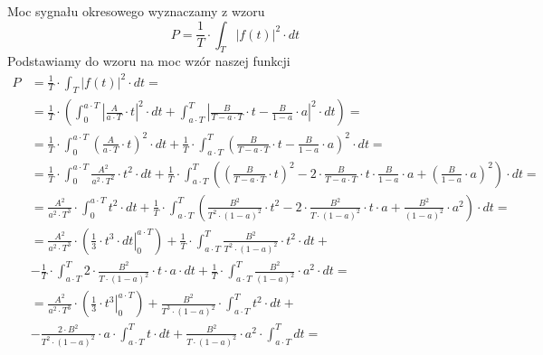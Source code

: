 \begin{task}
Moc sygnału okresowego wyznaczamy z wzoru
\begin{equation}
P=\frac{1}{T} \cdot \int_{T}^{}\left|f(t)\right|^2 \cdot dt
\end{equation}
Podstawiamy do wzoru na moc wzór naszej funkcji
\begin{align*}
P&=\frac{1}{T} \cdot \int_{T}^{}\left|f(t)\right|^2 \cdot dt=\\
 &=\frac{1}{T} \cdot \left( \int_{0}^{a \cdot T}\left|\frac{A}{a \cdot T}\cdot t \right|^2 \cdot dt
  +\int_{a \cdot T}^{T}\left|\frac{B}{T - a \cdot T}\cdot t - \frac{B}{1 - a} \cdot a\right|^2 \cdot dt \right)=\\ 
 &=\frac{1}{T} \cdot \int_{0}^{a \cdot T}\left(\frac{A}{a \cdot T}\cdot t \right)^2 \cdot dt
  +\frac{1}{T} \cdot \int_{a \cdot T}^{T}\left(\frac{B}{T - a \cdot T}\cdot t - \frac{B}{1 - a} \cdot a\right)^2 \cdot dt=\\ 
 &=\frac{1}{T} \cdot \int_{0}^{a \cdot T}\frac{A^2}{a^2 \cdot T^2}\cdot t^2 \cdot dt
 +\frac{1}{T} \cdot \int_{a \cdot T}^{T}\left(\left(\frac{B}{T - a \cdot T}\cdot t\right)^2 - 2\cdot \frac{B}{T - a \cdot T}\cdot t \cdot  \frac{B}{1 - a} \cdot a + \left( \frac{B}{1 - a} \cdot a\right)^2 \right) \cdot dt=\\
 &=\frac{A^2}{a^2 \cdot T^3}\cdot \int_{0}^{a \cdot T} t^2 \cdot dt
 +\frac{1}{T} \cdot \int_{a \cdot T}^{T}\left(\frac{B^2}{T^2 \cdot \left(1 - a \right)^2}\cdot t^2 - 2\cdot \frac{B^2}{T\cdot \left(1 - a\right)^2}\cdot t \cdot a + \frac{B^2}{\left(1 - a \right)^2} \cdot a^2 \right) \cdot dt=\\
 &=\frac{A^2}{a^2 \cdot T^3}\cdot \left(\left. \frac{1}{3}\cdot t^3 \cdot dt \right|_{0}^{a \cdot T} \right)
 +\frac{1}{T} \cdot \int_{a \cdot T}^{T} \frac{B^2}{T^2 \cdot \left(1 - a \right)^2}\cdot t^2 \cdot dt +\\
 &- \frac{1}{T} \cdot \int_{a \cdot T}^{T} 2\cdot \frac{B^2}{T\cdot \left(1 - a\right)^2}\cdot t \cdot a \cdot dt + \frac{1}{T} \cdot \int_{a \cdot T}^{T} \frac{B^2}{\left(1 - a \right)^2} \cdot a^2 \cdot dt=\\ 
 &=\frac{A^2}{a^2 \cdot T^3}\cdot \left(\left. \frac{1}{3}\cdot t^3 \right|_{0}^{a \cdot T} \right)
 +\frac{B^2}{T^3 \cdot \left(1 - a \right)^2}\cdot \int_{a \cdot T}^{T}  t^2 \cdot dt +\\
 &- \frac{2\cdot B^2}{T^2 \cdot \left(1 - a\right)^2}\cdot a \cdot \int_{a \cdot T}^{T} t \cdot dt 
 + \frac{B^2}{T \cdot \left(1 - a \right)^2} \cdot a^2 \cdot \int_{a \cdot T}^{T} dt=\\

\end{align*}
\end{task}
